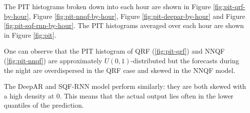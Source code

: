 The PIT histograms broken down into each hour are shown in Figure \ref{fig:pit-qrf-by-hour}, Figure \ref{fig:pit-nnqf-by-hour}, 
Figure \ref{fig:pit-deepar-by-hour} and Figure \ref{fig:pit-sqf-rnn-by-hour}. 
The PIT histograms averaged over each hour are shown in Figure \ref{fig:pit}. 

One can observe that the PIT histogram of QRF (\ref{fig:pit-qrf}) and NNQF (\ref{fig:pit-nnqf}) are approximately 
\(U(0,1)\)-distributed but the forecasts during the night are overdispersed in the QRF case and 
skewed in the NNQF model.

The DeepAR and SQF-RNN model perform similarly: they are both skewed with a high density at \(0\). 
This means that the actual output lies often in the lower quantiles of the prediction. 